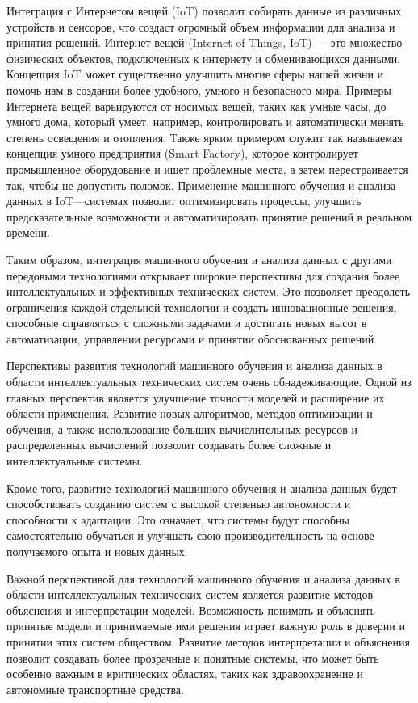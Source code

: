     Интеграция с Интернетом вещей (IoT) позволит собирать данные из различных устройств и сенсоров, что создаст огромный объем информации для анализа и принятия решений. Интернет вещей (Internet of Things, IoT) — это множество физических объектов, подключенных к интернету и обменивающихся данными. Концепция IoT может существенно улучшить многие сферы нашей жизни и помочь нам в создании более удобного, умного и безопасного мира. Примеры Интернета вещей варьируются от носимых вещей, таких как умные часы, до умного дома, который умеет, например, контролировать и автоматически менять степень освещения и отопления. Также ярким примером служит так называемая концепция умного предприятия (Smart Factory), которое контролирует промышленное оборудование и ищет проблемные места, а затем перестраивается так, чтобы не допустить поломок. Применение машинного обучения и анализа данных в IoT—системах позволит оптимизировать процессы, улучшить предсказательные возможности и автоматизировать принятие решений в реальном времени.
    
    Таким образом, интеграция машинного обучения и анализа данных с другими передовыми технологиями открывает широкие перспективы для создания более интеллектуальных и эффективных технических систем. Это позволяет преодолеть ограничения каждой отдельной технологии и создать инновационные решения, способные справляться с сложными задачами и достигать новых высот в автоматизации, управлении ресурсами и принятии обоснованных решений.
    
    Перспективы развития технологий машинного обучения и анализа данных в области интеллектуальных технических систем очень обнадеживающие. Одной из главных перспектив является улучшение точности моделей и расширение их области применения. Развитие новых алгоритмов, методов оптимизации и обучения, а также использование больших вычислительных ресурсов и распределенных вычислений позволит создавать более сложные и интеллектуальные системы.
    
    Кроме того, развитие технологий машинного обучения и анализа данных будет способствовать созданию систем с высокой степенью автономности и способности к адаптации. Это означает, что системы будут способны самостоятельно обучаться и улучшать свою производительность на основе получаемого опыта и новых данных.
    
    Важной перспективой для технологий машинного обучения и анализа данных в области интеллектуальных технических систем является развитие методов объяснения и интерпретации моделей. Возможность понимать и объяснять принятые модели и принимаемые ими решения играет важную роль в доверии и принятии этих систем обществом. Развитие методов интерпретации и объяснения позволит создавать более прозрачные и понятные системы, что может быть особенно важным в критических областях, таких как здравоохранение и автономные транспортные средства.
    
